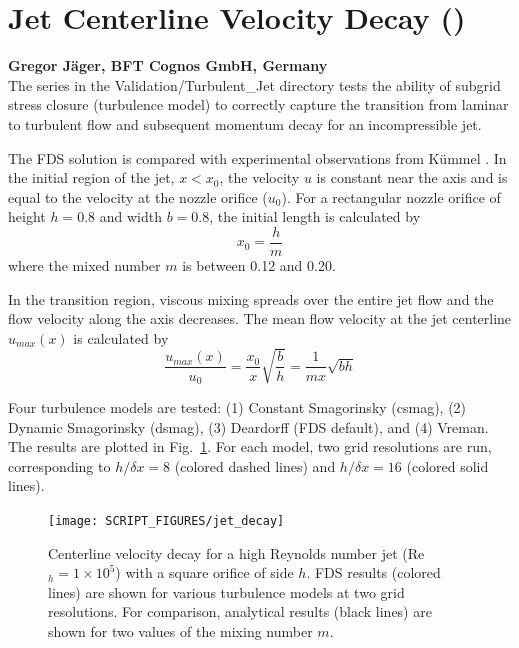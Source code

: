 \documentclass[11pt]{book}
\begin{document}
\section{Jet Centerline Velocity Decay (\texorpdfstring{}{jet})}

\textbf{Gregor J\"ager, BFT Cognos GmbH, Germany}\\

\noindent The  series in the Validation/Turbulent\_Jet directory tests the ability of subgrid stress closure (turbulence model) to correctly capture the transition from laminar to turbulent flow and subsequent momentum decay for an incompressible jet.

The FDS solution is compared with experimental observations from K\"ummel \cite{Kummel:2007}. In the initial region of the jet, $x<x_0$, the velocity $u$ is constant near the axis and is equal to the velocity at the nozzle orifice ($u_0$). For a rectangular nozzle orifice of height $h = 0.8$ and width $b = 0.8$, the initial length is calculated by
\begin{equation}
x_0 = \frac{h}{m}
\end{equation}
where the mixed number $m$ is between 0.12 and 0.20.

In the transition region, viscous mixing spreads over the entire jet flow and the flow velocity along the axis decreases. The mean flow velocity at the jet centerline $u_{max}(x)$ is calculated by
\begin{equation}
\frac{u_{max}(x)}{u_0} = \frac{x_0}{x}\sqrt{\frac{b}{h}} = \frac{1}{mx} \sqrt{bh}
\end{equation}

Four turbulence models are tested: (1) Constant Smagorinsky (csmag), (2) Dynamic Smagorinsky (dsmag), (3) Deardorff (FDS default), and (4) Vreman.  The results are plotted in Fig.~\ref{fig_jet_decay}. For each model, two grid resolutions are run, corresponding to $h/\delta x = 8$ (colored dashed lines) and $h/\delta x=16$ (colored solid lines).
\begin{figure}[h]
\centering
\texttt{[image: SCRIPT\_FIGURES/jet\_decay]}
\caption[Jet centerline velocity decay]{Centerline velocity decay for a high Reynolds number jet (Re$_h = 1 \times 10^5$) with a square orifice of side $h$.  FDS results (colored lines) are shown for various turbulence models at two grid resolutions.  For comparison, analytical results (black lines) are shown for two values of the mixing number $m$.}
\label{fig_jet_decay}
\end{figure}
\end{document}
